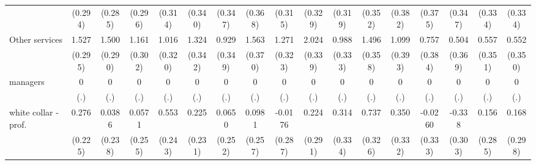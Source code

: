 {\begin{tabular}{l*{16}{c}}
                    &     (0.294)         &     (0.285)         &     (0.296)         &     (0.314)         &     (0.340)         &     (0.347)         &     (0.368)         &     (0.315)         &     (0.329)         &     (0.319)         &     (0.352)         &     (0.382)         &     (0.375)         &     (0.347)         &     (0.334)         &     (0.334)         \\
[1em]
Other services      &       1.527\sym{***}&       1.500\sym{***}&       1.161\sym{***}&       1.016\sym{**} &       1.324\sym{***}&       0.929\sym{**} &       1.563\sym{***}&       1.271\sym{***}&       2.024\sym{***}&       0.988\sym{**} &       1.496\sym{***}&       1.099\sym{**} &       0.757\sym{*}  &       0.504         &       0.557         &       0.552         \\
                    &     (0.295)         &     (0.290)         &     (0.302)         &     (0.320)         &     (0.342)         &     (0.349)         &     (0.370)         &     (0.323)         &     (0.339)         &     (0.333)         &     (0.358)         &     (0.393)         &     (0.384)         &     (0.369)         &     (0.351)         &     (0.350)         \\
[1em]
managers            &           0         &           0         &           0         &           0         &           0         &           0         &           0         &           0         &           0         &           0         &           0         &           0         &           0         &           0         &           0         &           0         \\
                    &         (.)         &         (.)         &         (.)         &         (.)         &         (.)         &         (.)         &         (.)         &         (.)         &         (.)         &         (.)         &         (.)         &         (.)         &         (.)         &         (.)         &         (.)         &         (.)         \\
[1em]
white collar - prof.&       0.276         &      0.0386         &      0.0571         &       0.553\sym{*}  &       0.225         &      0.0650         &      0.0981         &     -0.0176         &       0.224         &       0.314         &       0.737\sym{*}  &       0.350         &     -0.0260         &      -0.338         &       0.156         &       0.168         \\
                    &     (0.225)         &     (0.238)         &     (0.255)         &     (0.243)         &     (0.231)         &     (0.252)         &     (0.257)         &     (0.287)         &     (0.291)         &     (0.334)         &     (0.326)         &     (0.332)         &     (0.333)         &     (0.303)         &     (0.285)         &     (0.298)         \\

\end{tabular}}
